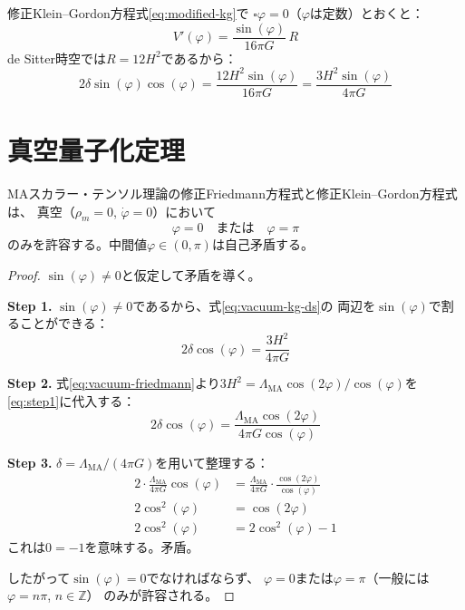修正Klein--Gordon方程式\eqref{eq:modified-kg}で
$\square\varphi = 0$（$\varphi$は定数）とおくと：
\begin{equation}
V'(\varphi) = \frac{\sin(\varphi)}{16\pi G}\,R
\label{eq:vacuum-kg}
\end{equation}
de Sitter時空では$R = 12H^2$であるから：
\begin{equation}
2\delta\sin(\varphi)\cos(\varphi) = \frac{12H^2\sin(\varphi)}{16\pi G}
= \frac{3H^2\sin(\varphi)}{4\pi G}
\label{eq:vacuum-kg-ds}
\end{equation}


\section{真空量子化定理}
\label{sec:9.2}

\begin{keyresult}[真空量子化定理]
\begin{theorem}[真空量子化]
\label{thm:vacuum-quantization}
MAスカラー・テンソル理論の修正Friedmann方程式と修正Klein--Gordon方程式は、
真空（$\rho_m = 0$, $\dot\varphi = 0$）において
\[
\boxed{\varphi = 0 \quad\text{または}\quad \varphi = \pi}
\]
のみを許容する。中間値$\varphi \in (0, \pi)$は自己矛盾する。
\end{theorem}
\end{keyresult}

\begin{proof}
$\sin(\varphi) \neq 0$と仮定して矛盾を導く。

\textbf{Step 1.}
$\sin(\varphi) \neq 0$であるから、式\eqref{eq:vacuum-kg-ds}の
両辺を$\sin(\varphi)$で割ることができる：
\begin{equation}
2\delta\cos(\varphi) = \frac{3H^2}{4\pi G}
\label{eq:step1}
\end{equation}

\textbf{Step 2.}
式\eqref{eq:vacuum-friedmann}より$3H^2 = \Lambda_{\mathrm{MA}}\cos(2\varphi)/\cos(\varphi)$を
\eqref{eq:step1}に代入する：
\begin{equation}
2\delta\cos(\varphi) = \frac{\Lambda_{\mathrm{MA}}\cos(2\varphi)}{4\pi G\cos(\varphi)}
\end{equation}

\textbf{Step 3.}
$\delta = \Lambda_{\mathrm{MA}}/(4\pi G)$を用いて整理する：
\begin{align}
2 \cdot \frac{\Lambda_{\mathrm{MA}}}{4\pi G}\cos(\varphi)
&= \frac{\Lambda_{\mathrm{MA}}}{4\pi G}\cdot\frac{\cos(2\varphi)}{\cos(\varphi)} \\
2\cos^2(\varphi) &= \cos(2\varphi) \\
2\cos^2(\varphi) &= 2\cos^2(\varphi) - 1
\end{align}
これは$0 = -1$を意味する。矛盾。

したがって$\sin(\varphi) = 0$でなければならず、
$\varphi = 0$または$\varphi = \pi$（一般には$\varphi = n\pi$, $n\in\mathbb{Z}$）
のみが許容される。
\end{proof}

